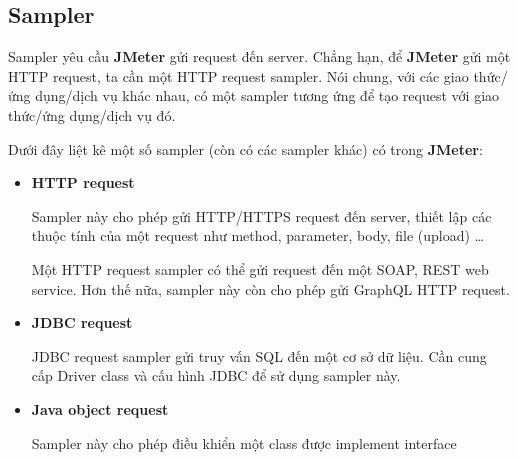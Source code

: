 \documentclass[10pt]{report}
\newcommand{\jmeter}{\textbf{JMeter}}
\begin{document}
\subsection{Sampler}

\par Sampler yêu cầu \jmeter{} gửi request đến server. Chẳng hạn, để \jmeter{} gửi một HTTP request, ta cần một HTTP request sampler. Nói chung, với các giao thức/ứng dụng/dịch vụ khác nhau, có một sampler tương ứng để tạo request với giao thức/ứng dụng/dịch vụ đó.

\par Dưới đây liệt kê một số sampler (còn có các sampler khác) có trong \jmeter{}:

\begin{itemize}[itemsep=0pt]
    \item \textbf{HTTP request}
        \par Sampler này cho phép gửi HTTP/HTTPS request đến server, thiết lập các thuộc tính của một request như method, parameter, body, file (upload) \ldots
        \par Một HTTP request sampler có thể gửi request đến một SOAP, REST web service. Hơn thế nữa, sampler này còn cho phép gửi GraphQL HTTP request.
    \item \textbf{JDBC request}
        \par JDBC request sampler gửi truy vấn SQL đến một cơ sở dữ liệu. Cần cung cấp Driver class và cấu hình JDBC để sử dụng sampler này.
    \item \textbf{Java object request}
        \par Sampler này cho phép điều khiển một class được implement interface


\end{itemize}
\end{document}
